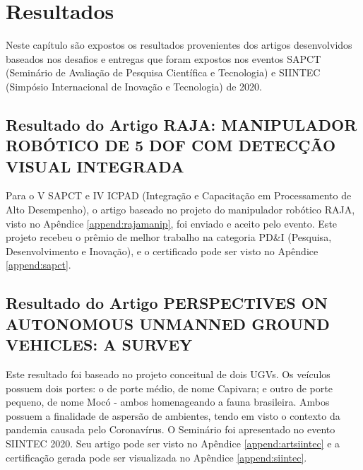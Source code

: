 \chapter{Resultados}
\label{chap:result}
Neste capítulo são expostos os resultados provenientes dos artigos desenvolvidos baseados nos desafios e entregas que foram expostos nos eventos SAPCT (Seminário de Avaliação de Pesquisa Científica e Tecnologia) e SIINTEC (Simpósio Internacional de Inovação e Tecnologia) de 2020.

\section{Resultado do Artigo RAJA: MANIPULADOR ROBÓTICO DE 5 DOF COM DETECÇÃO VISUAL INTEGRADA}
\label{sec:sapct}
Para o V SAPCT e IV ICPAD (Integração e Capacitação em Processamento de Alto Desempenho), o artigo baseado no projeto do manipulador robótico RAJA, visto no Apêndice \ref{append:rajamanip}, foi enviado e aceito pelo evento. Este projeto recebeu o prêmio de melhor trabalho na categoria PD\&I (Pesquisa, Desenvolvimento e Inovação), e o certificado pode ser visto no Apêndice \ref{append:sapct}.

\section{Resultado do Artigo PERSPECTIVES ON AUTONOMOUS UNMANNED GROUND VEHICLES: A SURVEY}
\label{sec:siintec}

Este resultado foi baseado no projeto conceitual de dois UGVs. Os veículos possuem dois portes: o de porte médio, de nome Capivara;  e outro de porte pequeno, de nome Mocó - ambos homenageando a fauna brasileira. Ambos possuem a finalidade de aspersão de ambientes, tendo em visto o contexto da pandemia causada pelo Coronavírus. O Seminário foi apresentado no evento SIINTEC 2020. Seu artigo pode ser visto no Apêndice  \ref{append:artsiintec} e a certificação gerada pode ser visualizada no Apêndice \ref{append:siintec}. 







